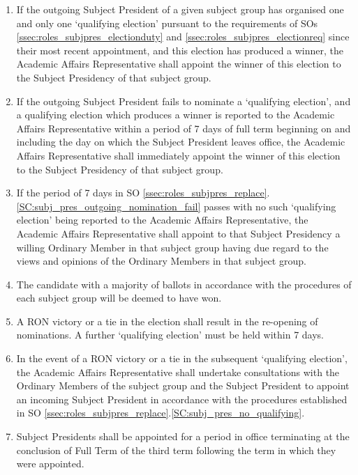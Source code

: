 \begin{enumerate}
    \item If the outgoing Subject President of a given subject group has organised one and only one `qualifying election' pursuant to the requirements of SOs \ref{ssec:roles_subjpres_electionduty} and \ref{ssec:roles_subjpres_electionreq} since their most recent appointment, and this election has produced a winner, the Academic Affairs Representative shall appoint the winner of this election to the Subject Presidency of that subject group.
    \item \label{SC:subj_pres_outgoing_nomination_fail} If the outgoing Subject President fails to nominate a `qualifying election', and a qualifying election which produces a winner is reported to the Academic Affairs Representative within a period of 7 days of full term beginning on and including the day on which the Subject President leaves office, the Academic Affairs Representative shall immediately appoint the winner of this election to the Subject Presidency of that subject group.
    \item \label{SC:subj_pres_no_qualifying} If the period of 7 days in SO \ref{ssec:roles_subjpres_replace}.\ref{SC:subj_pres_outgoing_nomination_fail} passes with no such `qualifying election' being reported to the Academic Affairs Representative, the Academic Affairs Representative shall appoint to that Subject Presidency a willing Ordinary Member in that subject group having due regard to the views and opinions of the Ordinary Members in that subject group.
    \item The candidate with a majority of ballots in accordance with the procedures of each subject group will be deemed to have won.
    \item A RON victory or a tie in the election shall result in the re-opening of nominations. A further `qualifying election' must be held within 7 days.
    \item In the event of a RON victory or a tie in the subsequent `qualifying election', the Academic Affairs Representative shall undertake consultations with the Ordinary Members of the subject group and the Subject President to appoint an incoming Subject President in accordance with the procedures established in SO \ref{ssec:roles_subjpres_replace}.\ref{SC:subj_pres_no_qualifying}.
    \item Subject Presidents shall be appointed for a period in office terminating at the conclusion of Full Term of the third term following the term in which they were appointed.
\end{enumerate}
